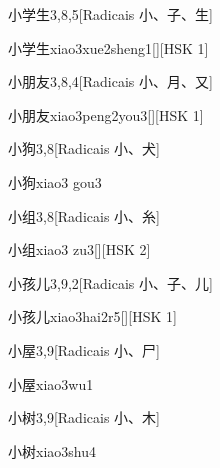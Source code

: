 \begin{entry}{小学生}{3,8,5}[Radicais ⼩、⼦、⽣]
  \begin{phonetics}{小学生}{xiao3xue2sheng1}[][HSK 1]
  \end{phonetics}
\end{entry}

\begin{entry}{小朋友}{3,8,4}[Radicais ⼩、⽉、⼜]
  \begin{phonetics}{小朋友}{xiao3peng2you3}[][HSK 1]
  \end{phonetics}
\end{entry}

\begin{entry}{小狗}{3,8}[Radicais ⼩、⽝]
  \begin{phonetics}{小狗}{xiao3 gou3}
  \end{phonetics}
\end{entry}

\begin{entry}{小组}{3,8}[Radicais ⼩、⽷]
  \begin{phonetics}{小组}{xiao3 zu3}[][HSK 2]
  \end{phonetics}
\end{entry}

\begin{entry}{小孩儿}{3,9,2}[Radicais ⼩、⼦、⼉]
  \begin{phonetics}{小孩儿}{xiao3hai2r5}[][HSK 1]
  \end{phonetics}
\end{entry}

\begin{entry}{小屋}{3,9}[Radicais ⼩、⼫]
  \begin{phonetics}{小屋}{xiao3wu1}
  \end{phonetics}
\end{entry}

\begin{entry}{小树}{3,9}[Radicais ⼩、⽊]
  \begin{phonetics}{小树}{xiao3shu4}
  \end{phonetics}
\end{entry}

